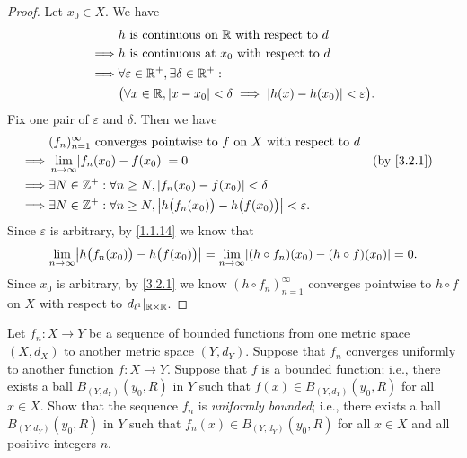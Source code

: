 \begin{proof}
  Let \(x_0 \in X\).
  We have
  \begin{align*}
             & h \text{ is continuous on } \mathbb{R} \text{ with respect to } d                                      \\
    \implies & h \text{ is continuous at } x_0 \text{ with respect to } d                                     \\
    \implies & \forall \varepsilon \in \mathbb{R}^+, \exists \delta \in \mathbb{R}^+ :                                        \\
             & \big(\forall x \in \mathbb{R}, \left\lvert x - x_0\right\rvert < \delta \implies \left\lvert h(x) - h(x_0)\right\rvert < \varepsilon\big).
  \end{align*}
  Fix one pair of \(\varepsilon\) and \(\delta\).
  Then we have
  \begin{align*}
             & (f_n)_{n = 1}^\infty \text{ converges pointwise to } f \text{ on } X \text{ with respect to } d                     \\
    \implies & \lim_{n \to \infty} \abs{f_n(x_0) - f(x_0)} = 0                                                     &  & \by{3.2.1} \\
    \implies & \exists N \in \Z^+ : \forall n \geq N, \abs{f_n(x_0) - f(x_0)} < \delta                                             \\
    \implies & \exists N \in \Z^+ : \forall n \geq N, \abs{h\big(f_n(x_0)\big) - h\big(f(x_0)\big)} < \varepsilon.
  \end{align*}
  Since \(\varepsilon\) is arbitrary, by \cref{1.1.14} we know that
  \[
    \lim_{n \to \infty} \abs{h\big(f_n(x_0)\big) - h\big(f(x_0)\big)} = \lim_{n \to \infty} \abs{(h \circ f_n)(x_0) - (h \circ f)(x_0)} = 0.
  \]
  Since \(x_0\) is arbitrary, by \cref{3.2.1} we know \((h \circ f_n)_{n = 1}^\infty\) converges pointwise to \(h \circ f\) on \(X\) with respect to \(d_{l^1}|_{\mathbb{R} \times \mathbb{R}}\).
\end{proof}

\begin{ex}\label{ex:3.2.4}
  Let \(f_n : X \to Y\) be a sequence of bounded functions from one metric space \((X, d_X)\) to another metric space \((Y, d_Y)\).
  Suppose that \(f_n\) converges uniformly to another function \(f : X \to Y\).
  Suppose that \(f\) is a bounded function;
  i.e., there exists a ball \(B_{(Y, d_Y)}(y_0, R)\) in \(Y\) such that \(f(x) \in B_{(Y, d_Y)}(y_0, R)\) for all \(x \in X\).
  Show that the sequence \(f_n\) is \emph{uniformly bounded};
  i.e., there exists a ball \(B_{(Y, d_Y)}(y_0, R)\) in \(Y\) such that \(f_n(x) \in B_{(Y, d_Y)}(y_0, R)\) for all \(x \in X\) and all positive integers \(n\).
\end{ex}

